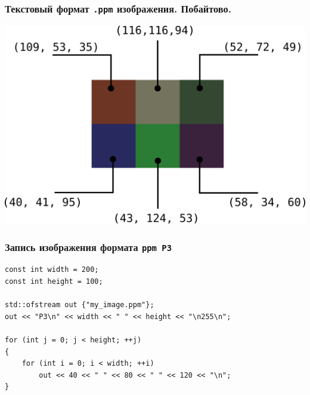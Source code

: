 \documentclass[10pt,pdf,hyperref={unicode}]{beamer}
\begin{document}
\begin{frame}[fragile]
\frametitle{Текстовый формат \texttt{.ppm} изображения. Побайтово.} 
\begin{multicols}{2}
\includegraphics[scale=0.45]{./images/tiny_new_wn.png}
\vfill

\noindent{}
\end{multicols}
\end{frame}



\begin{frame}[fragile]
\frametitle{Запись изображения формата \texttt{ppm P3} } 
\begin{lstlisting}
const int width = 200;
const int height = 100;

std::ofstream out {"my_image.ppm"};
out << "P3\n" << width << " " << height << "\n255\n";

for (int j = 0; j < height; ++j)
{
    for (int i = 0; i < width; ++i)
        out << 40 << " " << 80 << " " << 120 << "\n";
}
\end{lstlisting}
\end{frame}
\end{document}
